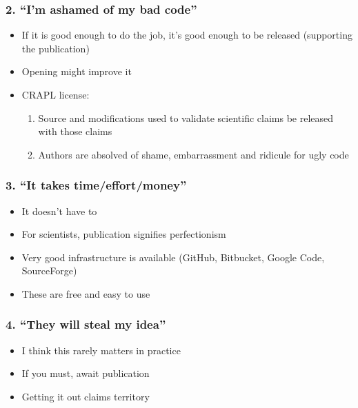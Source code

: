 \documentclass[slidestop]{beamer}
\begin{document}
{
  \frame{}
}

\begin{frame}
  \frametitle{2. ``I'm ashamed of my bad code''}
  \pause
  \begin{itemize}[<+->]
    \item If it is good enough to do the job, it's good enough to be released
      (supporting the publication)
    \item Opening might improve it
    \item CRAPL license:
      \begin{enumerate}
        \item Source and modifications used to validate scientific claims be
          released with those claims
        \item Authors are absolved of shame, embarrassment and ridicule for
          ugly code
      \end{enumerate}
  \end{itemize}
\end{frame}

\begin{frame}
  \frametitle{3. ``It takes time/effort/money''}
  \pause
  \begin{itemize}
    \item It doesn't have to
    \item For scientists, publication signifies perfectionism
    \item Very good infrastructure is available (GitHub, Bitbucket, Google
      Code, SourceForge)
    \item These are free and easy to use
  \end{itemize}
\end{frame}

\begin{frame}
  \frametitle{4. ``They will steal my idea''}
  \pause
  \begin{itemize}
    \item I think this rarely matters in practice
    \item If you must, await publication
    \item Getting it out claims territory %
  \end{itemize}
\end{frame}
\end{document}
